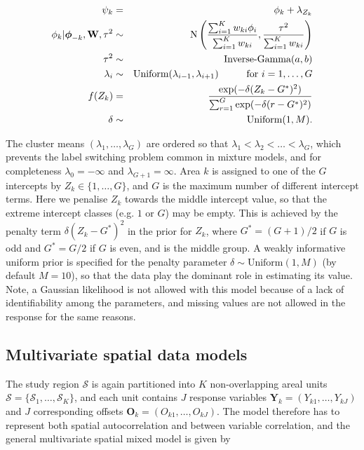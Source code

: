 \documentclass[article,shortnames,nojss]{jss}
\newcommand{\bd}[1]{\ensuremath{\mbox{\boldmath $#1$}}}
\begin{document}
\begin{eqnarray}
\psi_k & = & \phi_{k} + \lambda_{Z_{k}}\label{equation cluster}\\
\phi_{k}| \bd{\phi}_{-k}, \mathbf{W}, \tau^2&\sim&\mbox{N}\left(\frac{\sum_{i=1}^{K}w_{ki}\phi_{i}}{\sum_{i=1}^{K}w_{ki}},\frac{\tau^{2}}{\sum_{i=1}^{K}w_{ki}}\right)\nonumber\\
\tau^{2}&\sim&\mbox{Inverse-Gamma}(a, b)\nonumber\\
\lambda_i & \sim & \mbox{Uniform}(\lambda_{i-1}, \lambda_{i+1})\hspace{1cm}\mbox{for }i=1,\ldots,G\nonumber\\
f(Z_{k})&=&\frac{\exp(-\delta(Z_{k}-G^{*})^{2})}{\sum_{r=1}^{G}\exp(-\delta(r-G^{*})^{2})}\nonumber\\
\delta&\sim&\mbox{Uniform}(1, M).\nonumber
\end{eqnarray}

The cluster means $(\lambda_{1},\ldots,\lambda_{G})$ are ordered so that $\lambda_{1}<\lambda_{2}<\ldots<\lambda_{G}$, which prevents the label switching problem common in mixture models, and for completeness $\lambda_{0}=-\infty$ and $\lambda_{G+1}=\infty$.  Area $k$ is assigned to one of the $G$ intercepts by $Z_{k}\in\{1,\ldots,G\}$, and $G$ is the maximum number of different intercept terms. Here we penalise $Z_{k}$ towards the middle intercept value, so that the extreme intercept classes (e.g. $1$ or $G$) may be empty. This is achieved by the penalty term $\delta(Z_{k}-G^{*})^{2}$ in the prior for $Z_{k}$, where $G^{*}=(G+1)/2$ if $G$ is odd and $G^{*}=G/2$ if $G$ is even, and is the middle group. A weakly informative uniform prior is specified for the penalty parameter $\delta\sim\mbox{Uniform}(1,M)$ (by default $M=10$), so that the data play the dominant role in estimating its value. Note, a Gaussian likelihood is not allowed with this model because of a lack of identifiability among the parameters, and missing values are not allowed in the response for the same reasons.


\subsection{Multivariate spatial data models}
The study region $\mathcal{S}$ is again partitioned into $K$ non-overlapping areal units $\mathcal{S}=\{\mathcal{S}_{1},\ldots,\mathcal{S}_{K}\}$, and each unit contains $J$ response variables  $\mathbf{Y}_{k}=(Y_{k1},\ldots,Y_{kJ})$ and $J$ corresponding offsets $\mathbf{O}_{k}=(O_{k1},\ldots,O_{kJ})$. The model therefore has to represent both spatial autocorrelation and between variable correlation, and the general multivariate spatial mixed model  is given by
\end{document}
